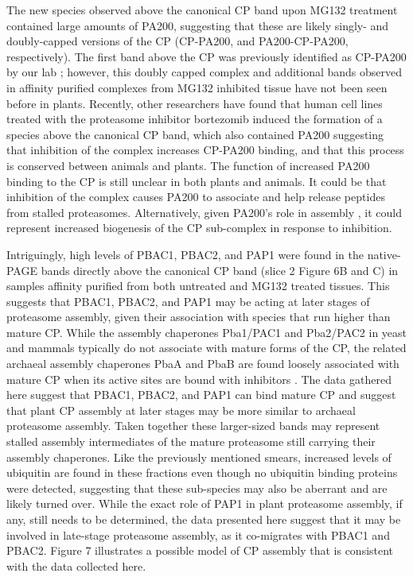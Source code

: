 	The new species observed above the canonical CP band upon MG132 treatment contained large amounts of PA200, suggesting that these are likely singly- and doubly-capped versions of the CP (CP-PA200, and PA200-CP-PA200, respectively). The first band above the CP was previously identified as CP-PA200 by our lab \citep{book10}; however, this doubly capped complex and additional bands observed in affinity purified complexes from MG132 inhibited tissue have not been seen before in plants. Recently, other researchers have found that human cell lines treated with the proteasome inhibitor bortezomib induced the formation of a species above the canonical CP band, which also contained PA200 \citep{welk16} suggesting that inhibition of the complex increases CP-PA200 binding, and that this process is conserved between animals and plants. The function of increased PA200 binding to the CP is still unclear in both plants and animals. It could be that inhibition of the complex causes PA200 to associate and help release peptides from stalled proteasomes. Alternatively, given PA200’s role in assembly \citep{savulescu11}, it could represent increased biogenesis of the CP sub-complex in response to inhibition.
	
Intriguingly, high levels of PBAC1, PBAC2, and PAP1 were found in the native-PAGE bands directly above the canonical CP band (slice 2 Figure 6B and C) in samples affinity purified from both untreated and MG132 treated tissues. This suggests that PBAC1, PBAC2, and PAP1 may be acting at later stages of proteasome assembly, given their association with species that run higher than mature CP. While the assembly chaperones Pba1/PAC1 and Pba2/PAC2 in yeast and mammals typically do not associate with mature forms of the CP, the related archaeal assembly chaperones PbaA and PbaB are found loosely associated with mature CP when its active sites are bound with inhibitors \citep{kusmierczyk11}. The data gathered here suggest that PBAC1, PBAC2, and PAP1 can bind mature CP and suggest that plant CP assembly at later stages may be more similar to archaeal proteasome assembly. Taken together these larger-sized bands may represent stalled assembly intermediates of the mature proteasome still carrying their assembly chaperones. Like the previously mentioned smears, increased levels of ubiquitin are found in these fractions even though no ubiquitin binding proteins were detected, suggesting that these sub-species may also be aberrant and are likely turned over. While the exact role of PAP1 in plant proteasome assembly, if any, still needs to be determined, the data presented here suggest that it may be involved in late-stage proteasome assembly, as it co-migrates with PBAC1 and PBAC2. Figure 7 illustrates a possible model of CP assembly that is consistent with the data collected here. 

